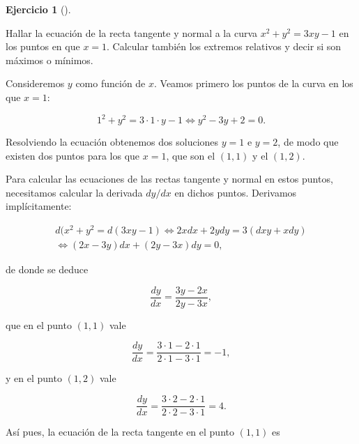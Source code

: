 \documentclass[
  spanish,
  a4paper,
]{scrreport}
\theoremstyle{definition}
\newtheorem{exercise}{Ejercicio}[chapter]
\theoremstyle{remark}
\begin{document}
\begin{exercise}[]\protect\hypertarget{exr-derivada-implicita-4}{}\label{exr-derivada-implicita-4}

Hallar la ecuación de la recta tangente y normal a la curva
\(x^2+y^2=3xy-1\) en los puntos en que \(x=1\). Calcular también los
extremos relativos y decir si son máximos o mínimos.

\end{exercise}

\begin{tcolorbox}[enhanced jigsaw, arc=.35mm, bottomrule=.15mm, bottomtitle=1mm, breakable, colback=white, colbacktitle=quarto-callout-tip-color!10!white, colframe=quarto-callout-tip-color-frame, coltitle=black, left=2mm, leftrule=.75mm, opacityback=0, opacitybacktitle=0.6, rightrule=.15mm, title=\textcolor{quarto-callout-tip-color}{\faLightbulb}\hspace{0.5em}{Solución}, titlerule=0mm, toprule=.15mm, toptitle=1mm]

Consideremos \(y\) como función de \(x\). Veamos primero los puntos de
la curva en los que \(x=1\):

\[
1^{2}+y^{2} = 3\cdot 1\cdot y-1 \Leftrightarrow y^{2} -3y+2 = 0.
\]

Resolviendo la ecuación obtenemos dos soluciones \(y=1\) e \(y=2\), de
modo que existen dos puntos para los que \(x=1\), que son el \((1,1)\) y
el \((1,2)\).

Para calcular las ecuaciones de las rectas tangente y normal en estos
puntos, necesitamos calcular la derivada \(dy/dx\) en dichos puntos.
Derivamos implícitamente:

\[
\begin{gathered}
d(x^{2}+y^{2} = d(3xy-1) \Leftrightarrow 2xdx+2ydy = 3(dxy+xdy) \\ \Leftrightarrow (2x-3y)dx+(2y-3x)dy = 0,
\end{gathered}
\]

de donde se deduce

\[
\frac{dy}{dx} = \frac{3y-2x}{2y-3x},
\]

que en el punto \((1,1)\) vale

\[
\frac{dy}{dx} = \frac{3\cdot 1 - 2\cdot 1}{2\cdot 1-3\cdot 1} = -1,
\]

y en el punto \((1,2)\) vale

\[
\frac{dy}{dx} = \frac{3\cdot 2 - 2\cdot 1}{2\cdot 2-3\cdot 1} = 4.
\]

Así pues, la ecuación de la recta tangente en el punto \((1,1)\) es


\end{tcolorbox}
\end{document}

